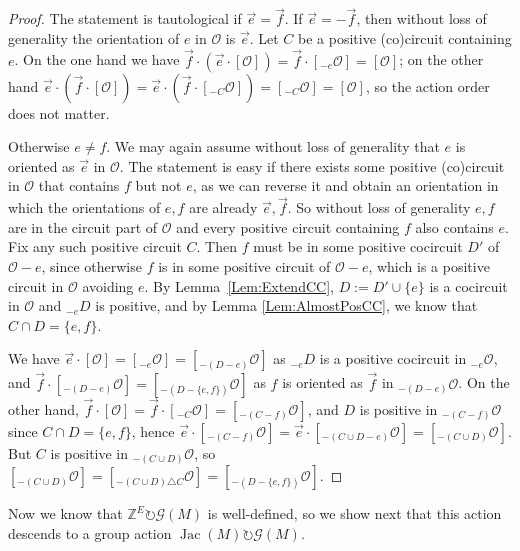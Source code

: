 \documentclass[12pt]{amsart}
\numberwithin{equation}{section}
\theoremstyle{definition}
\newcommand{\Jac}{\operatorname{Jac}}
\begin{document}
\begin{proof}
The statement is tautological if $\overrightarrow{e}=\overrightarrow{f}$. If $\overrightarrow{e}=-\overrightarrow{f}$, then without loss of generality the orientation of $e$ in $\mathcal{O}$ is $\overrightarrow{e}$.  Let $C$ be a positive (co)circuit containing $e$. On the one hand we have $\overrightarrow{f}\cdot(\overrightarrow{e}\cdot[\mathcal{O}])=\overrightarrow{f}\cdot[_{-e}\mathcal{O}]=[\mathcal{O}]$; on the other hand $\overrightarrow{e}\cdot(\overrightarrow{f}\cdot [\mathcal{O}])=\overrightarrow{e}\cdot(\overrightarrow{f}\cdot [_{-C}\mathcal{O}])=[_{-C}\mathcal{O}]=[\mathcal{O}]$, so the action order does not matter.

Otherwise $e\neq f$. We may again assume without loss of generality that $e$ is oriented as $\overrightarrow{e}$ in $\mathcal{O}$. The statement is easy if there exists some positive (co)circuit in $\mathcal{O}$ that contains $f$ but not $e$, as we can reverse it and obtain an orientation in which the orientations of $e,f$ are already $\overrightarrow{e},\overrightarrow{f}$.
So without loss of generality $e,f$ are in the circuit part of $\mathcal{O}$ and every positive circuit containing $f$ also contains $e$.  Fix any such positive circuit $C$. Then $f$ must be in some positive cocircuit $D'$ of $\mathcal{O}-e$, since otherwise $f$ is in some positive circuit of $\mathcal{O}-e$, which is a positive circuit in $\mathcal{O}$ avoiding $e$. By Lemma~\ref{Lem:ExtendCC},  $D:=D'\cup\{e\}$ is a cocircuit in $\mathcal{O}$ and $_{-e}D$ is positive, and by Lemma \ref{Lem:AlmostPosCC}, we know that $C\cap D=\{e,f\}$.

We have $\overrightarrow{e}\cdot[\mathcal{O}]=[_{-e}\mathcal{O}]=[_{-(D-e)}\mathcal{O}]$ as $_{-e}D$ is a positive cocircuit in $_{-e}\mathcal{O}$, and $\overrightarrow{f}\cdot[_{-(D-e)}\mathcal{O}]=[_{-(D-\{e,f\})}\mathcal{O}]$ as $f$ is oriented as $\overrightarrow{f}$ in $_{-(D-e)}\mathcal{O}$. On the other hand, $\overrightarrow{f}\cdot[\mathcal{O}]=\overrightarrow{f}\cdot[_{-C}\mathcal{O}]=[_{-(C-f)}\mathcal{O}]$, and $D$ is positive in $_{-(C-f)}\mathcal{O}$ since $C\cap D=\{e,f\}$, hence $\overrightarrow{e}\cdot [_{-(C-f)}\mathcal{O}]=\overrightarrow{e}\cdot[_{-(C\cup D-e)}\mathcal{O}]=[_{-(C\cup D)}\mathcal{O}]$. But $C$ is positive in $_{-(C\cup D)}\mathcal{O}$, so $[_{-(C\cup D)}\mathcal{O}]=[_{-(C\cup D)\triangle C}\mathcal{O}]=[_{-(D-\{e,f\})}\mathcal{O}]$.
\end{proof}


Now we know that $\mathbb{Z}^E\circlearrowright\mathcal{G}(M)$ is well-defined, so we show next that this  action descends to a group action $\Jac(M)\circlearrowright\mathcal{G}(M)$.
\end{document}
